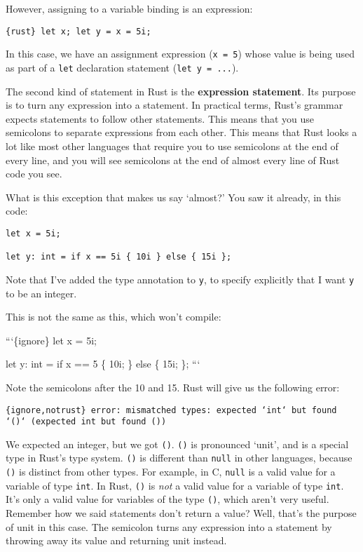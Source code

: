\documentclass[]{article}
\begin{document}
However, assigning to a variable binding is an expression:

\texttt{\{rust\} let x; let y = x = 5i;}

In this case, we have an assignment expression (\texttt{x = 5}) whose
value is being used as part of a \texttt{let} declaration statement
(\texttt{let y = ...}).

The second kind of statement in Rust is the \textbf{expression
statement}. Its purpose is to turn any expression into a statement. In
practical terms, Rust's grammar expects statements to follow other
statements. This means that you use semicolons to separate expressions
from each other. This means that Rust looks a lot like most other
languages that require you to use semicolons at the end of every line,
and you will see semicolons at the end of almost every line of Rust code
you see.

What is this exception that makes us say `almost?' You saw it already,
in this code:

\begin{verbatim}
let x = 5i;

let y: int = if x == 5i { 10i } else { 15i };
\end{verbatim}

Note that I've added the type annotation to \texttt{y}, to specify
explicitly that I want \texttt{y} to be an integer.

This is not the same as this, which won't compile:

```\{ignore\} let x = 5i;

let y: int = if x == 5 \{ 10i; \} else \{ 15i; \}; ```

Note the semicolons after the 10 and 15. Rust will give us the following
error:

\texttt{\{ignore,notrust\} error: mismatched types: expected `int` but found `()` (expected int but found ())}

We expected an integer, but we got \texttt{()}. \texttt{()} is
pronounced `unit', and is a special type in Rust's type system.
\texttt{()} is different than \texttt{null} in other languages, because
\texttt{()} is distinct from other types. For example, in C,
\texttt{null} is a valid value for a variable of type \texttt{int}. In
Rust, \texttt{()} is \emph{not} a valid value for a variable of type
\texttt{int}. It's only a valid value for variables of the type
\texttt{()}, which aren't very useful. Remember how we said statements
don't return a value? Well, that's the purpose of unit in this case. The
semicolon turns any expression into a statement by throwing away its
value and returning unit instead.
\end{document}
